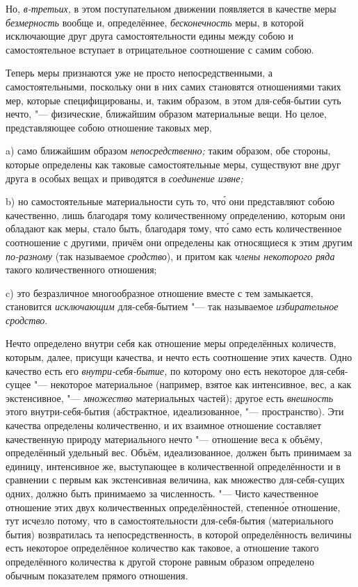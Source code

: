Но, {\em в-третьих,} в этом поступательном движении появляется в качестве меры
{\em безмерность} вообще и, определённее, {\em бесконечность} меры, в которой
исключающие друг друга самостоятельности едины между собою и самостоятельное
вступает в отрицательное соотношение с самим собою.


Теперь меры признаются уже не просто непосредственными, а самостоятельными,
поскольку они в них самих становятся отношениями таких мер, которые
специфицированы, и, таким образом, в этом для-себя-бытии суть нечто, "---
физические, ближайшим образом материальные вещи. Но целое, представляющее
собою отношение таковых мер,

a) само ближайшим образом {\em непосредственно;} таким образом, обе стороны,
которые определены как таковые самостоятельные меры, существуют вне друг друга
в особых вещах и приводятся в {\em соединение извне;}

b) но самостоятельные материальности суть то, чт\'{о} они представляют собою
качественно, лишь благодаря тому количественному определению, которым они
обладают как меры, стало быть, благодаря тому, чт\'{о} само есть количественное
соотношение с другими, причём они определены как относящиеся к этим другим
{\em по-разному} (так называемое {\em сродство}), и притом как
{\em члены некоторого ряда} такого количественного отношения;

c) это безразличное многообразное отношение вместе с тем замыкается,
становится {\em исключающим} для-себя-бытием "--- так называемое
{\em избирательное сродство}.


Нечто определено внутри себя как отношение меры определённых количеств,
которым, далее, присущи качества, и нечто есть соотношение этих качеств. Одно
качество есть его {\em внутри-себя-бытие,} по которому оно есть некоторое
для-себя-сущее "--- некоторое материальное (например, взятое как интенсивное,
вес, а как экстенсивное, "--- {\em множество} материальных частей); другое есть
{\em внешность} этого внутри-себя-бытия (абстрактное, идеализованное, "---
пространство). Эти качества определены количественно, и их взаимное отношение
составляет качественную природу материального нечто "--- отношение веса к
объёму, определённый удельный вес. Объём, идеализованное, должен быть
принимаем за единицу, интенсивное же, выступающее в количественной
определённости и в сравнении с первым как экстенсивная величина, как множество
для-себя-сущих одних, должно быть принимаемо за численность. "--- Чисто
качественное отношение этих двух количественных определённостей, степенн\'{о}е
отношение, тут исчезло потому, что в самостоятельности для-себя-бытия
(материального бытия) возвратилась та непосредственность, в которой
определённость величины есть некоторое определённое количество как таковое, а
отношение такого определённого количества к другой стороне равным образом
определено обычным показателем прямого отношения.

